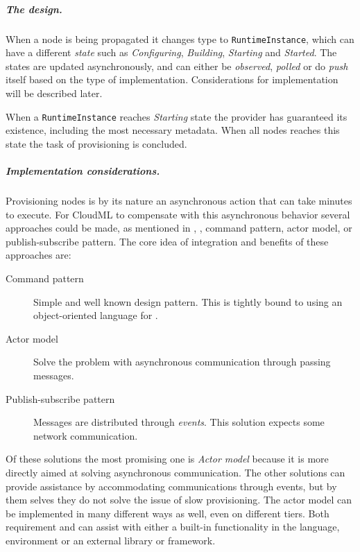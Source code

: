 \subparagraph{The design.}

When a node is being propagated it changes type to \texttt{RuntimeInstance}, 
which can have a different \emph{state} such as 
\emph{Configuring}, \emph{Building}, \emph{Starting} and \emph{Started}.
The states are updated asynchronously, and can either be 
\emph{observed}, \emph{polled} or do \emph{push} itself based on the type of implementation.
Considerations for implementation will be described later.

When a \texttt{RuntimeInstance} reaches \emph{Starting} state the provider 
has guaranteed its existence, including the most necessary metadata.
When all nodes reaches this state the task of provisioning is concluded.

\subparagraph{Implementation considerations.}

Provisioning nodes is by its nature an asynchronous action that can take minutes to execute.
For CloudML to compensate with this asynchronous behavior several approaches could be made,
as mentioned in , \eg, command pattern, actor model,
or publish-subscribe pattern.
The core idea of integration and benefits of these approaches are:
\begin{description}
  \item[Command pattern] Simple and well known design pattern. 
    This is tightly bound to using an object-oriented language for .
  \item[Actor model] Solve the problem with asynchronous communication through passing messages.
  \item[Publish-subscribe pattern] Messages are distributed through \emph{events}.
    This solution expects some network communication.
\end{description}
Of these solutions the most promising one is \emph{Actor model} because it is more directly aimed
at solving asynchronous communication.
The other solutions can provide assistance by accommodating communications through events, 
but by them selves they do not solve the issue of slow provisioning.
The actor model can be implemented in many different ways as well, even on different tiers.
Both requirement  and  can assist with either
a built-in functionality in the language, environment or an external library or framework.

